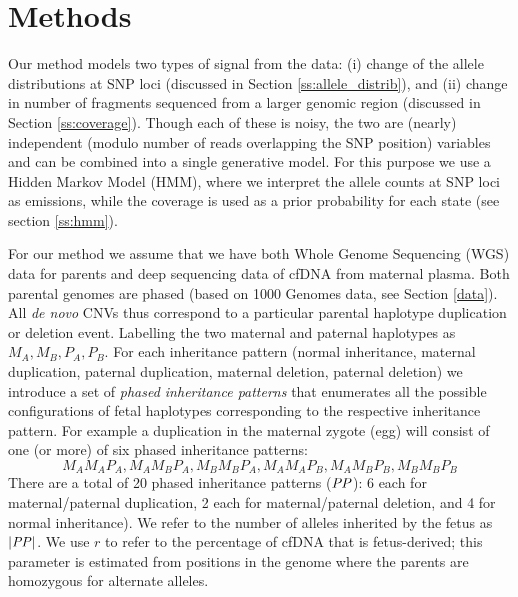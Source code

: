 \section{Methods}
Our method models two types of signal from the data: (i) change of the allele distributions at SNP loci (discussed in Section \ref{ss:allele_distrib}), and (ii) change in number of fragments sequenced from a larger genomic region (discussed in Section \ref{ss:coverage}). Though each of these is noisy, the two are (nearly) independent (modulo number of reads overlapping the SNP position) variables and can be combined into a single generative model. For this purpose we use a Hidden Markov Model (HMM), where we interpret the allele counts at SNP loci as emissions, while the coverage is used as a prior probability for each state (see section \ref{ss:hmm}). 

For our method we assume that we have both Whole Genome Sequencing (WGS) data for parents and deep sequencing data of cfDNA from maternal plasma. Both parental genomes are phased (based on 1000 Genomes data, see Section \ref{data}). All \textit{de novo} CNVs thus correspond to a particular parental haplotype duplication or deletion event. Labelling the two maternal and paternal haplotypes as $M_A,M_B,P_A,P_B$. For each inheritance pattern (normal inheritance, maternal duplication, paternal duplication, maternal deletion, paternal deletion) we introduce a set of \textit{phased inheritance patterns} that enumerates all the possible configurations of fetal haplotypes corresponding to the respective inheritance pattern. For example a duplication in the maternal zygote (egg) will consist of one (or more) 
of  six phased inheritance patterns: 
$$M_AM_AP_A, M_AM_BP_A, M_BM_BP_A, M_AM_AP_B, M_AM_BP_B, M_BM_BP_B$$
There are a total of 20 phased inheritance patterns ($\mathit{PP}$): 6 each for maternal/paternal duplication, 2 each for maternal/paternal deletion, and 4 for normal inheritance). We refer to the number of alleles inherited by the fetus as $|\mathit{PP}|$. We use $r$ to refer to the percentage of cfDNA that is fetus-derived; this parameter is estimated from positions in the genome where the parents are homozygous for alternate alleles.


